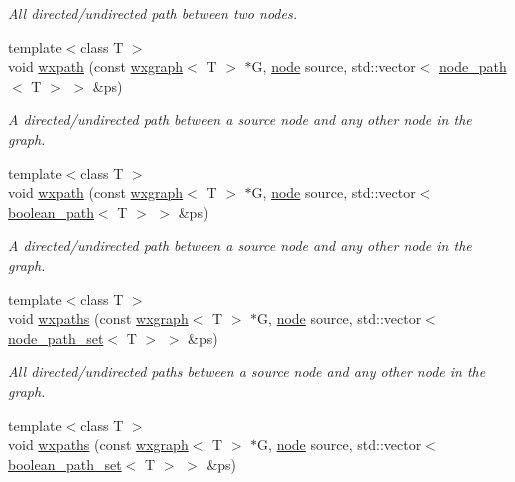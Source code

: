 \begin{DoxyCompactItemize}
\begin{DoxyCompactList}\small\item\em All directed/undirected path between two nodes. \end{DoxyCompactList}\item 
{\footnotesize template$<$class T $>$ }\\void \hyperlink{namespacelgraph_1_1traversal_ae10a39ab07f1f914d64498729bbad09d}{wxpath} (const \hyperlink{classlgraph_1_1wxgraph}{wxgraph}$<$ T $>$ $\ast$G, \hyperlink{namespacelgraph_a397169dd66adf725210a30fb7251773e}{node} source, std\-::vector$<$ \hyperlink{classlgraph_1_1node__path}{node\-\_\-path}$<$ T $>$ $>$ \&ps)
\begin{DoxyCompactList}\small\item\em A directed/undirected path between a source node and any other node in the graph. \end{DoxyCompactList}\item 
{\footnotesize template$<$class T $>$ }\\void \hyperlink{namespacelgraph_1_1traversal_a493f120f7abd50cc8c2edc914199ef3d}{wxpath} (const \hyperlink{classlgraph_1_1wxgraph}{wxgraph}$<$ T $>$ $\ast$G, \hyperlink{namespacelgraph_a397169dd66adf725210a30fb7251773e}{node} source, std\-::vector$<$ \hyperlink{classlgraph_1_1boolean__path}{boolean\-\_\-path}$<$ T $>$ $>$ \&ps)
\begin{DoxyCompactList}\small\item\em A directed/undirected path between a source node and any other node in the graph. \end{DoxyCompactList}\item 
{\footnotesize template$<$class T $>$ }\\void \hyperlink{namespacelgraph_1_1traversal_a2288b1d8a900fd71302816bc0f6a7d01}{wxpaths} (const \hyperlink{classlgraph_1_1wxgraph}{wxgraph}$<$ T $>$ $\ast$G, \hyperlink{namespacelgraph_a397169dd66adf725210a30fb7251773e}{node} source, std\-::vector$<$ \hyperlink{namespacelgraph_a0570ce57129123d5816913d287f6cc73}{node\-\_\-path\-\_\-set}$<$ T $>$ $>$ \&ps)
\begin{DoxyCompactList}\small\item\em All directed/undirected paths between a source node and any other node in the graph. \end{DoxyCompactList}\item 
{\footnotesize template$<$class T $>$ }\\void \hyperlink{namespacelgraph_1_1traversal_a44125e6be3246de94b8c0a0ef7e15926}{wxpaths} (const \hyperlink{classlgraph_1_1wxgraph}{wxgraph}$<$ T $>$ $\ast$G, \hyperlink{namespacelgraph_a397169dd66adf725210a30fb7251773e}{node} source, std\-::vector$<$ \hyperlink{namespacelgraph_afad432931ba600ab1628d5c9595986c5}{boolean\-\_\-path\-\_\-set}$<$ T $>$ $>$ \&ps)

\end{DoxyCompactItemize}
